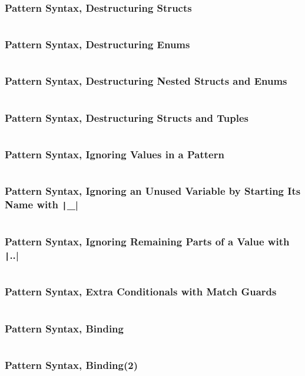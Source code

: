 \documentclass{beamer}
\begin{document}
\begin{frame}[fragile]
	\frametitle{Pattern Syntax, Destructuring Structs}
	\inputminted[fontsize=\scriptsize]{rust}{./code/pattern10.rs}
\end{frame}


\begin{frame}[fragile]
	\frametitle{Pattern Syntax, Destructuring Enums}
	\inputminted[fontsize=\scriptsize]{rust}{./code/pattern11.rs}
\end{frame}

\begin{frame}[fragile]
	\frametitle{Pattern Syntax, Destructuring Nested Structs and Enums}
	\inputminted[fontsize=\scriptsize]{rust}{./code/pattern12.rs}
\end{frame}


\begin{frame}[fragile]
	\frametitle{Pattern Syntax, Destructuring Structs and Tuples}
	\inputminted[fontsize=\scriptsize]{rust}{./code/pattern13.rs}
\end{frame}



\begin{frame}[fragile]
	\frametitle{Pattern Syntax, Ignoring Values in a Pattern}
	\inputminted[fontsize=\scriptsize]{rust}{./code/pattern14.rs}
\end{frame}


\begin{frame}[fragile]
	\frametitle{Pattern Syntax, Ignoring an Unused Variable by Starting Its Name with \texttt|_|}
	\inputminted{rust}{./code/pattern15.rs}
\end{frame}



\begin{frame}[fragile]
	\frametitle{Pattern Syntax, Ignoring Remaining Parts of a Value with \texttt|..|}
	\inputminted{rust}{./code/pattern16.rs}
\end{frame}


\begin{frame}[fragile]
	\frametitle{Pattern Syntax, Extra Conditionals with Match Guards}
	\inputminted{rust}{./code/pattern17.rs}
\end{frame}


\begin{frame}[fragile]
	\frametitle{Pattern Syntax, Binding}
	\inputminted{rust}{./code/pattern18.rs}
\end{frame}

\begin{frame}[fragile]
	\frametitle{Pattern Syntax, Binding(2)}
	\inputminted{rust}{./code/pattern19.rs}
\end{frame}
\end{document}
